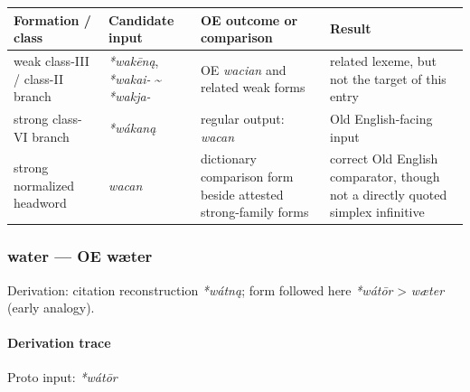 \documentclass[
  british,
  a4paper,
]{article}
\newcounter{none} %
\begin{document}
{\def\LTcaptype{none} %
\begin{longtable}[]{@{}
  >{\raggedright\arraybackslash}p{}
  >{\raggedright\arraybackslash}p{}
  >{\raggedright\arraybackslash}p{}
  >{\raggedright\arraybackslash}p{}@{}}
\toprule\noalign{}
\begin{minipage}[b]{\linewidth}\raggedright
Formation / class
\end{minipage} & \begin{minipage}[b]{\linewidth}\raggedright
Candidate input
\end{minipage} & \begin{minipage}[b]{\linewidth}\raggedright
OE outcome or comparison
\end{minipage} & \begin{minipage}[b]{\linewidth}\raggedright
Result
\end{minipage} \\
\midrule\noalign{}
\endhead
\bottomrule\noalign{}
\endlastfoot
weak class-III / class-II branch & \emph{*wakēną}, \emph{*wakai-}
\textasciitilde{} \emph{*wakja-} & OE \emph{wacian} and related weak
forms & related lexeme, but not the target of this entry \\
strong class-VI branch & \emph{*wákaną} & regular output: \emph{wacan} &
Old English-facing input \\
strong normalized headword & \emph{wacan} & dictionary comparison form
beside attested strong-family forms & correct Old English comparator,
though not a directly quoted simplex infinitive \\
\end{longtable}
}

\subsubsection{water --- OE wæter}\label{water-oe-wuxe6ter}

Derivation: citation reconstruction \emph{*wátną}; form followed here
\emph{*wátōr} \textgreater{} \emph{wæter} (early analogy).

\paragraph{Derivation trace}\label{derivation-trace-33}

Proto input: \emph{*wátōr}
\end{document}
